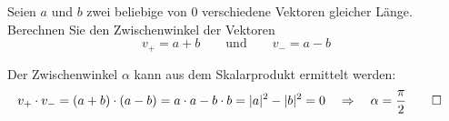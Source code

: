Seien $a$ und $b$ zwei beliebige von $0$ verschiedene Vektoren gleicher Länge.
Berechnen Sie den Zwischenwinkel der Vektoren
\[
v_+=a+b
\qquad\text{und}\qquad
v_-=a -b
\]

\begin{loesung}
Der Zwischenwinkel  $\alpha$ kann aus dem Skalarprodukt ermittelt werden:
\begin{align*}
v_+\cdot v_-
&=
(a+b) \cdot (a-b)
=
a\cdot a-b\cdot b=|a|^2-|b|^2=0\quad\Rightarrow\quad \alpha=\frac{\pi}2
\qedhere
\end{align*}
\end{loesung}


